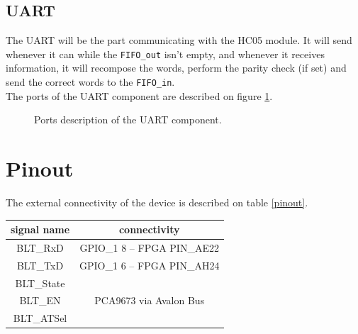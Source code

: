 \documentclass[11pt]{article}
\begin{document}
\subsection{UART}
The UART will be the part communicating with the HC05 module. It will send whenever it can while the \texttt{FIFO\_out} isn't empty, and whenever it receives information, it will recompose the words, perform the parity check (if set) and send the correct words to the \texttt{FIFO\_in}.
\\
The ports of the UART component are described on figure \ref{uart_ports}.
\begin{figure}[H]
        \caption{Ports description of the UART component.}
        \label{uart_ports}
\end{figure}

\section{Pinout}
The external connectivity of the device is described on table \ref{pinout}.
\begin{center}
\label{pinout}
\begin{tabular}{|c|c|}
\hline
signal name & connectivity\\
\hline
BLT\_RxD & GPIO\_1 8 -- FPGA PIN\_AE22\\
\hline
BLT\_TxD & GPIO\_1 6 -- FPGA PIN\_AH24\\
\hline
BLT\_State & \multirow{3}{*}{PCA9673 via Avalon Bus}\\
\cline{1-1}
BLT\_EN &\\
\cline{1-1}
BLT\_ATSel &\\
\hline
\end{tabular}
\end{center}
\end{document}
